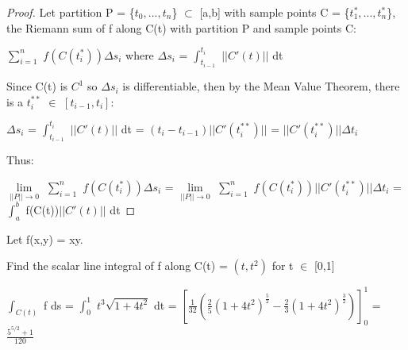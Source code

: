     \begin{proof}
        Let partition P = \{$t_0,...,t_n$\} $\subset$ [a,b]
        with sample points C = \{$t_1^*,...,t_n^*$\},
        the Riemann sum of f along C(t) with partition P and sample points C:

        \hspace{0.5cm}
        $\sum_{i=1}^n$ $f(C(t_i^*)) \Delta s_i$
        \hspace{1cm}
        where $\Delta s_i$ = $\int_{t_{i-1}}^{t_i}$ $||C'(t)||$ dt

        Since C(t) is $C^1$ so $\Delta s_i$ is differentiable, then
        by the Mean Value Theorem, there is a $t_i^{**}$ $\in$ $[t_{i-1},t_i]$:

        \hspace{0.5cm}
        $\Delta s_i$ = $\int_{t_{i-1}}^{t_i}$ $||C'(t)||$ dt
        = $(t_i - t_{i-1})||C'(t_i^{**})||$
        = $||C'(t_i^{**})|| \Delta t_i$

        Thus:

        $\underset{||P|| \rightarrow 0}{\lim}$
            $\sum_{i=1}^n$ $f(C(t_i^*)) \Delta s_i$
        = $\underset{||P|| \rightarrow 0}{\lim}$
            $\sum_{i=1}^n$ $f(C(t_i^*)) ||C'(t_i^{**})|| \Delta t_i$
        = $\int_a^b$ f(C(t))$|| C'(t) ||$ dt
    \end{proof}

    \newpage



    \begin{example}
        Let f(x,y) = xy.
        
        Find the scalar line integral of f along C(t)
        = $(t,t^2)$ for t $\in$ [0,1]
    \end{example}

    \begin{tbox}
        $\int_{C(t)}$ f ds
        = $\int_0^1$ $t^3 \sqrt{1+4t^2}$ dt
        = $[\frac{1}{32}(\frac{2}{5}(1+4t^2)^{\frac{5}{2}}
                -\frac{2}{3}(1+4t^2)^{\frac{3}{2}})]_0^1$
        = $\frac{5^{5/2}+1}{120}$
    \end{tbox}

    \vspace{0.5cm}



